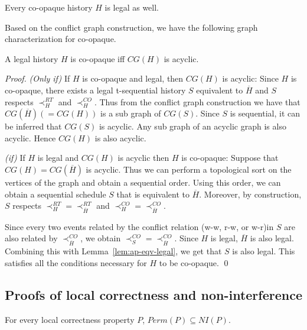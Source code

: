 \documentclass{llncs}
\newcommand{\lemref}[1]{Lemma~\ref{lem:#1}}
\newcommand{\permfn}[1] {\textit{Perm}(#1)}
\newcommand{\nifn}[1] {\textit{NI}(#1)}
\newcommand{\cg}[1] {CG(#1)}
\newcommand{\legal} {legal}
\newcommand{\coop} {co-opaque}
\begin{document}
\begin{corollary}
\label{cor:coop-legal}
Every \coop{} history $H$ is \legal{} as well.
\end{corollary}
Based on the conflict graph construction,
we have the following graph characterization for \coop.

\begin{theorem}
\label{thm:ap-graph}
A \legal{} history $H$ is \coop{} iff $\cg{H}$ is acyclic. 
\end{theorem}

\begin{proof}


\noindent
\textit{(Only if)} If $H$ is \coop{} and legal, then
$\cg{H}$ is acyclic:
Since $H$ is \coop{}, there exists a legal t-sequential
history $S$ equivalent to $\overline{H}$ and $S$ respects
$\prec_{H}^{RT}$ and $\prec_{H}^{CO}$. Thus from the conflict graph
construction we have that $\cg{\overline{H}} (= \cg{H})$ is a sub
graph of $\cg{S}$. Since $S$ is sequential, it can be inferred that
$\cg{S}$ is acyclic. Any sub graph of an acyclic graph is also
acyclic. Hence $\cg{H}$ is also acyclic. 

\vspace{1mm}
\noindent
\textit{(if)} If $H$ is \legal{} and $\cg{H}$ is acyclic then $H$ is
\coop: 
Suppose that $\cg{H}=\cg{\overline{H}}$ is acyclic. Thus we can
perform a topological sort on the vertices of the graph and obtain a
sequential order. Using this order, we can obtain a sequential
schedule $S$ that is equivalent to $\overline{H}$.
Moreover, by construction, $S$ respects $\prec_{H}^{RT} =
\prec_{\overline{H}}^{RT}$ 
and $\prec_{H}^{CO} = \prec_{\overline{H}}^{CO}$. 

Since every two events related by the conflict relation (w-w, r-w, or
w-r)in $S$ are also related by $\prec_{\overline{H}}^{CO}$, we obtain 
$\prec_{S}^{CO} = \prec_{\overline{H}}^{CO}$. 
Since $H$ is legal, $\overline{H}$ is also legal. 
Combining this with \lemref{ap-eqv-legal}, we get that $S$ is also
\legal. 
This satisfies all the conditions necessary for $H$ to be \coop. \qed
\end{proof}



\subsection{Proofs of local correctness and non-interference}
\label{subsec:ap-local}

\begin{theorem}
\label{lem:ap-perm_ni}
For every local correctness property $P$, 
$\permfn{P}\subseteq \nifn{P}$.
\end{theorem}
\end{document}
